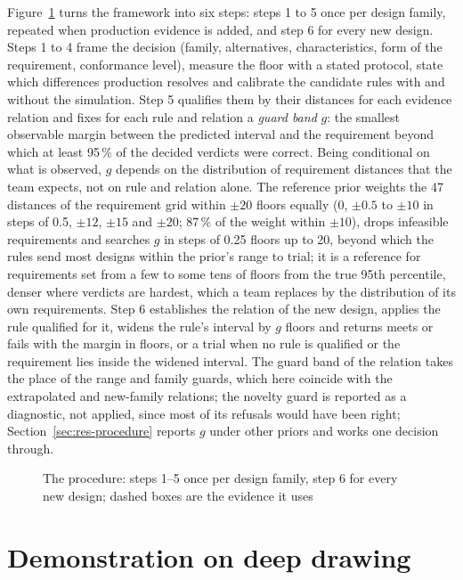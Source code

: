 \documentclass[pdflatex,sn-basic,lineno]{sn-jnl}
\begin{document}
Figure~\ref{fig:procedure} turns the framework into six steps: steps 1 to 5 once per design family, repeated when production evidence is added, and step 6 for every new design. Steps 1 to 4 frame the decision (family, alternatives, characteristics, form of the requirement, conformance level), measure the floor with a stated protocol, state which differences production resolves and calibrate the candidate rules with and without the simulation. Step 5 qualifies them by their distances for each evidence relation and fixes for each rule and relation a \emph{guard band} $g$: the smallest observable margin between the predicted interval and the requirement beyond which at least 95\,\% of the decided verdicts were correct. Being conditional on what is observed, $g$ depends on the distribution of requirement distances that the team expects, not on rule and relation alone. The reference prior weights the 47 distances of the requirement grid within $\pm20$ floors equally (0, $\pm0.5$ to $\pm10$ in steps of 0.5, $\pm12$, $\pm15$ and $\pm20$; 87\,\% of the weight within $\pm10$), drops infeasible requirements and searches $g$ in steps of 0.25 floors up to 20, beyond which the rules send most designs within the prior's range to trial; it is a reference for requirements set from a few to some tens of floors from the true 95th percentile, denser where verdicts are hardest, which a team replaces by the distribution of its own requirements. Step 6 establishes the relation of the new design, applies the rule qualified for it, widens the rule's interval by $g$ floors and returns meets or fails with the margin in floors, or a trial when no rule is qualified or the requirement lies inside the widened interval. The guard band of the relation takes the place of the range and family guards, which here coincide with the extrapolated and new-family relations; the novelty guard is reported as a diagnostic, not applied, since most of its refusals would have been right; Section~\ref{sec:res-procedure} reports $g$ under other priors and works one decision through.

\begin{figure}[t]
\centering

\caption{The procedure: steps 1--5 once per design family, step 6 for every new design; dashed boxes are the evidence it uses}\label{fig:procedure}
\end{figure}

\section{Demonstration on deep drawing}\label{sec:demo}
\end{document}
